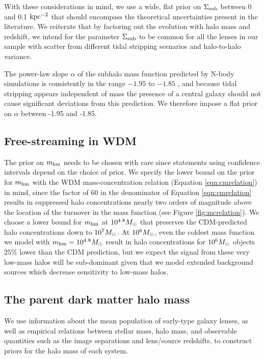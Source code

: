 With these considerations in mind, we use a wide, flat prior on $\Sigma_{\rm{sub}}$ between 0 and 0.1 $\rm{kpc^{-2}}$ that should encompass the theoretical uncertainties present in the literature. We reiterate that by factoring out the evolution with halo mass and redshift, we intend for the parameter $\Sigma_{\rm{sub}}$ to be common for all the lenses in our sample with scatter from different tidal stripping scenarios and halo-to-halo variance.

The power-law slope $\alpha$ of the subhalo mass function predicted by N-body simulations is consistently in the range $-1.95$ to $-1.85$ \cite{Springel++08,Fiacconi++16}, and because tidal stripping appears independent of mass the presence of a central galaxy should not cause significant deviations from this prediction. We therefore impose a flat prior on $\alpha$ between -1.95 and -1.85. 

\subsection{Free-streaming in WDM}
\label{ssec:wdmassumptions}
The prior on ${m_{\rm{hm}}}$ needs to be chosen with care since statements using confidence intervals depend on the choice of prior. We specify the lower bound on the prior for ${m_{\rm{hm}}}$ with the WDM mass-concentration relation (Equation \ref{eqn:cmrelation}) in mind, since the factor of 60 in the denominator of Equation \ref{eqn:cmrelation} results in suppressed halo concentrations nearly two orders of magnitude above the location of the turnover in the mass function (see Figure \ref{fig:mcrelation}). We choose a lower bound for ${m_{\rm{hm}}}$ at $10^{4.8} {M_{\odot}}$ that preserves the CDM-predicted halo concentrations down to $10^7 {M_{\odot}}$. At $10^6 {M_{\odot}}$, even the coldest mass function we model with ${m_{\rm{hm}}} = 10^{4.8} {M_{\odot}}$ result in halo concentrations for $10^{6} {M_{\odot}}$ objects $25\%$ lower than the CDM prediction, but we expect the signal from these very low-mass halos will be sub-dominant given that we model extended background sources which decrease sensitivity to low-mass halos. 

\subsection{The parent dark matter halo mass}
We use information about the mean population of early-type galaxy lenses, as well as empirical relations between stellar mass, halo mass, and observable quantities such as the image separations and lens/source redshifts, to construct priors for the halo mass of each system.  

